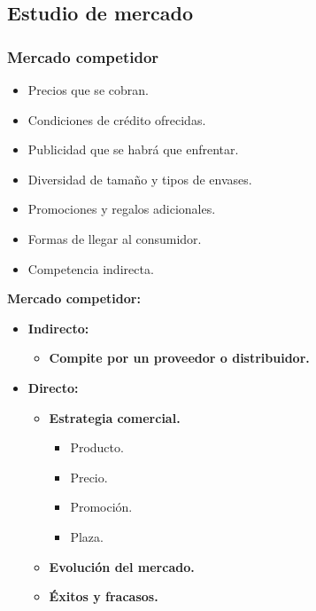 \documentclass{templateNote}
\begin{document}
\newpage
\subsection{Estudio de mercado}

\subsubsection{Mercado competidor}
\begin{itemize}
    \item Precios que se cobran.
    \item Condiciones de crédito ofrecidas.
    \item Publicidad que se habrá que enfrentar.
    \item Diversidad de tamaño y tipos de envases.
    \item Promociones y regalos adicionales.
    \item Formas de llegar al consumidor.
    \item Competencia indirecta.
\end{itemize}

\textbf{Mercado competidor:}
\begin{itemize}
    \item \textbf{Indirecto:}
    \begin{itemize}
        \item \textbf{Compite por un proveedor o distribuidor.}
    \end{itemize}
    \item \textbf{Directo:}
    \begin{itemize}
        \item \textbf{Estrategia comercial.}
        \begin{itemize}
            \item Producto.
            \item Precio.
            \item Promoción.
            \item Plaza.
        \end{itemize}
        \item \textbf{Evolución del mercado.}
        \item \textbf{Éxitos y fracasos.}
    \end{itemize}
\end{itemize}
\end{document}
